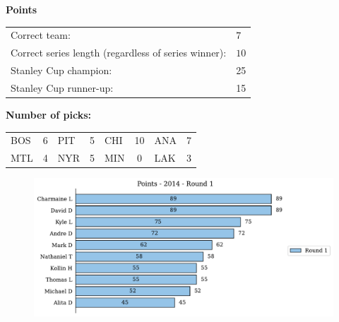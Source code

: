 \documentclass[10pt]{article}
\begin{document}
{\bf Points}\\
\begin{minipage}{12cm}
    \begin{tabular}{l l}
        Correct team:	& $7$\\
        Correct series length (regardless of series winner):	& $10$\\
        Stanley Cup champion:	& 25\\
        Stanley Cup runner-up:	& 15\\
    \end{tabular}

    \vspace{0.5cm}
    {\bf Number of picks:}\\
    \begin{tabular}{lc | lc | lc | lc }
        BOS & 6 & PIT & 5 & CHI & 10 & ANA & 7 \\
        MTL & 4 & NYR & 5 & MIN & 0 & LAK & 3 \\
    \end{tabular}
\end{minipage}
\begin{minipage}[t]{13cm}
    \begin{figure}[H]
        \vspace{-3.5cm}
        \includegraphics[width=12cm]{../../figures/2014/Points-2014-Round1.pdf}
    \end{figure}
\end{minipage}
\end{document}
